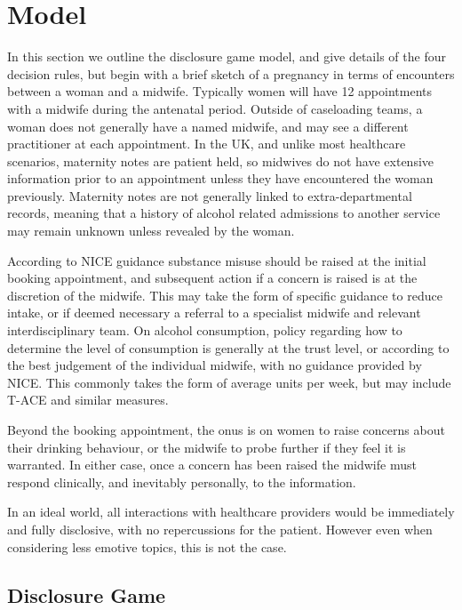 \section{Model}
\label{sec:model}

In this section we outline the disclosure game model, and give details of the four decision rules, but begin with a brief sketch of a pregnancy in terms of encounters between a woman and a midwife. 
Typically women will have 12 appointments with a midwife during the antenatal period. Outside of caseloading teams, a woman does not generally have a named midwife, and may see a different practitioner at each appointment. In the UK, and unlike most healthcare scenarios, maternity notes are patient held, so midwives do not have extensive information prior to an appointment unless they have encountered the woman previously. Maternity notes are not generally linked to extra-departmental records, meaning that a history of alcohol related admissions to another service may remain unknown unless revealed by the woman.

According to NICE guidance \citep{NICE2010a,NICE2010} substance misuse should be raised at the initial booking appointment, and subsequent action if a concern is raised is at the discretion of the midwife. This may take the form of specific guidance to reduce intake, or if deemed necessary a referral to a specialist midwife and relevant interdisciplinary team. On alcohol consumption, policy regarding how to determine the level of consumption is generally at the trust level, or according to the best judgement of the individual midwife, with no guidance provided by NICE. This commonly takes the form of average units per week, but may include \ac{T-ACE} and similar measures. 

Beyond the booking appointment, the onus is on women to raise concerns about their drinking behaviour, or the midwife to probe further if they feel it is warranted. In either case, once a concern has been raised the midwife must respond clinically, and inevitably personally, to the information.

In an ideal world, all interactions with healthcare providers would be immediately and fully disclosive, with no repercussions for the patient. However even when considering less emotive topics, this is not the case. 

\subsection{Disclosure Game}
\label{sub:the_game}

